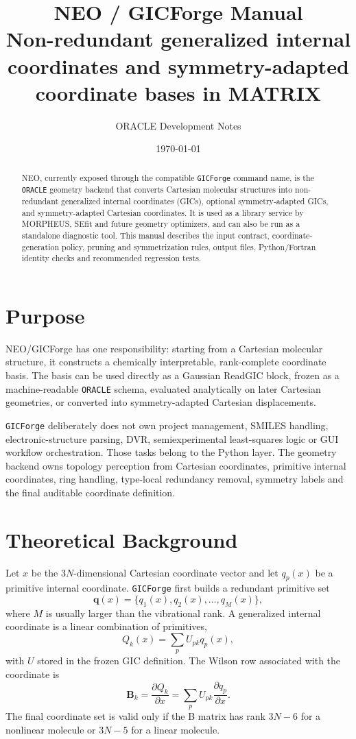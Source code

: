 \documentclass[11pt]{article}
\title{\textbf{NEO / GICForge Manual}\\
\large Non-redundant generalized internal coordinates and symmetry-adapted coordinate bases in MATRIX}
\author{ORACLE Development Notes}
\date{\today}
\newcommand{\program}{\texttt{GICForge}}
\newcommand{\oracle}{\texttt{ORACLE}}
\begin{document}
\maketitle

\begin{abstract}
NEO, currently exposed through the compatible \program{} command name, is the
\oracle{} geometry backend that converts Cartesian molecular
structures into non-redundant generalized internal coordinates (GICs), optional
symmetry-adapted GICs, and symmetry-adapted Cartesian coordinates.  It is used
as a library service by MORPHEUS, SEfit and future geometry optimizers, and can
also be run as a standalone diagnostic tool.  This manual describes the input
contract, coordinate-generation policy, pruning and symmetrization rules, output
files, Python/Fortran identity checks and recommended regression tests.
\end{abstract}

\tableofcontents
\newpage

\section{Purpose}

NEO/GICForge has one responsibility: starting from a Cartesian molecular
structure, it constructs a chemically interpretable, rank-complete coordinate
basis.  The basis can be used directly as a Gaussian ReadGIC block, frozen as a
machine-readable \oracle{} schema, evaluated analytically on later Cartesian
geometries, or converted into symmetry-adapted Cartesian displacements.

\program{} deliberately does not own project management, SMILES handling,
electronic-structure parsing, DVR, semiexperimental least-squares logic or GUI
workflow orchestration.  Those tasks belong to the Python layer.  The geometry
backend owns topology perception from Cartesian coordinates, primitive internal
coordinates, ring handling, type-local redundancy removal, symmetry labels and
the final auditable coordinate definition.

\section{Theoretical Background}

Let \(x\) be the \(3N\)-dimensional Cartesian coordinate vector and let
\(q_p(x)\) be a primitive internal coordinate.  \program{} first builds a
redundant primitive set
\[
  \mathbf{q}(x)=\{q_1(x),q_2(x),\ldots,q_M(x)\},
\]
where \(M\) is usually larger than the vibrational rank.  A generalized
internal coordinate is a linear combination of primitives,
\[
  Q_k(x)=\sum_p U_{pk} q_p(x),
\]
with \(U\) stored in the frozen GIC definition.  The Wilson row associated with
the coordinate is
\[
  \mathbf{B}_k = \frac{\partial Q_k}{\partial x}
              = \sum_p U_{pk}\frac{\partial q_p}{\partial x}.
\]
The final coordinate set is valid only if the B matrix has rank \(3N-6\) for a
nonlinear molecule or \(3N-5\) for a linear molecule.
\end{document}
